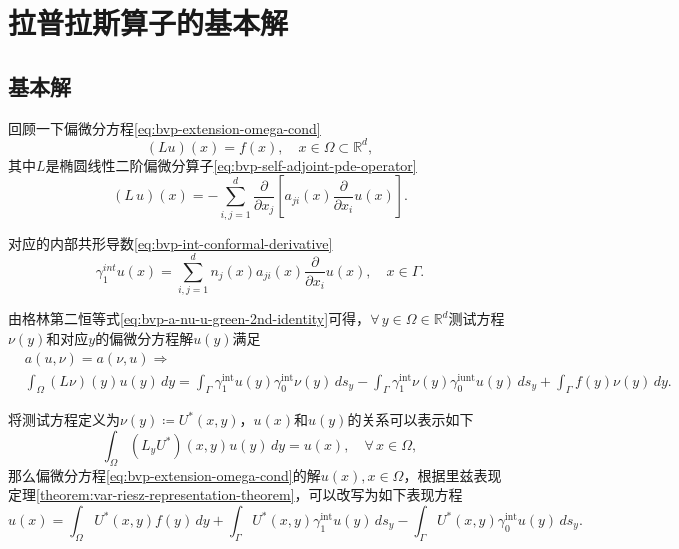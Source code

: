 \section{拉普拉斯算子的基本解}
\label{bvp-laplace-fund-solutions}

\subsection{基本解}
\label{bvp-fund-solutions}

回顾一下偏微分方程\eqref{eq:bvp-extension-omega-cond}
\begin{equation*}
  \left( L u \right)(x) = f(x), \quad x \in \Omega \subset \mathbb{R}^d,
\end{equation*}
其中$L$是椭圆线性二阶偏微分算子\eqref{eq:bvp-self-adjoint-pde-operator}
\begin{equation*}
  \left( L \, u \right)(x) = - \sum_{i,j=1}^d \frac{\partial}{\partial x_j} \left[ a_{ji} (x) \frac{\partial}{\partial x_i} u(x)\right].
\end{equation*}

对应的内部共形导数\eqref{eq:bvp-int-conformal-derivative}
\begin{equation*}
  \gamma_1^{int}u(x) =
\sum_{i,j=1}^{d} n_j(x) a_{ji} \left( x \right) \frac{\partial}{\partial x_{i}} u \left( x \right)
  , \quad x \in \Gamma.
\end{equation*}

由格林第二恒等式\eqref{eq:bvp-a-nu-u-green-2nd-identity}可得，$\forall \, y \in \Omega \in \mathbb{R}^d$测试方程$\nu(y)$和对应$y$的偏微分方程解$u(y)$满足
\begin{equation*}
  \begin{split}
    &a(u,\nu) = a(\nu,u) \Rightarrow \\
    &\int_{\Omega} (L \nu)(y) u(y) \, dy =
    \int_{\Gamma} \gamma_{1}^{\text{int}} u(y) \gamma_{0}^{\text{int}} \nu(y) \, d s_y
    - \int_{\Gamma} \gamma_{1}^{\text{int}} \nu(y) \gamma_{0}^{\text{iunt}} u(y) \, d s_y
    + \int_{\Gamma} f(y) \nu(y) \, dy.
  \end{split}
\end{equation*}

将测试方程定义为$\nu(y) \coloneqq U^{*}(x,y)$，$u(x)$和$u(y)$的关系可以表示如下
\begin{equation*}
  \label{eq:bvp-fund-ux-uy}
  \int_{\Omega} \left( L_{y} U^{*} \right) (x,y) u(y) \, dy = u(x), \quad \forall \, x \in \Omega,
\end{equation*}
那么偏微分方程\eqref{eq:bvp-extension-omega-cond}的解$u(x), x \in \Omega$，根据里兹表现定理\ref{theorem:var-riesz-representation-theorem}，可以改写为如下表现方程
\begin{equation}
  \label{eq:bvp-fund-var-ux-uy}
  u(x) = \int_{\Omega} U^{*}(x,y) f(y) \, dy
  + \int_{\Gamma} U^{*}(x,y) \gamma_{1}^{\text{int}} u(y) \, d s_y
  - \int_{\Gamma} U^{*}(x,y) \gamma_{0}^{\text{int}} u(y) \, d s_y.
\end{equation}

